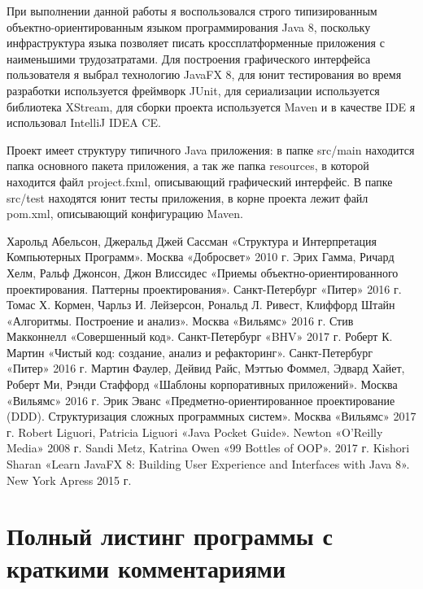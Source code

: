 \documentclass[russian,utf8,simple,hpadding=10mm,vpadding=20mm]{eskdtext}
\begin{document}
При выполнении данной работы я воспользовался строго типизированным объектно-ориентированным языком программирования Java 8, поскольку инфраструктура языка позволяет писать кроссплатформенные приложения с наименьшими трудозатратами. Для построения графического интерфейса пользователя я выбрал технологию JavaFX 8, для юнит тестирования во время разработки используется фреймворк JUnit, для сериализации используется библиотека XStream, для сборки проекта используется Maven и в качестве IDE я использовал IntelliJ IDEA CE.

Проект имеет структуру типичного Java приложения: в папке src/main находится папка основного пакета приложения, а так же папка resources, в которой находится файл project.fxml, описывающий графический интерфейс. В папке src/test находятся юнит тесты приложения, в корне проекта лежит файл pom.xml, описывающий конфигурацию Maven.

\newpage
\begin{thebibliography}{99}
	Харольд Абельсон, Джеральд Джей Сассман «Структура и Интерпретация Компьютерных Программ». Москва «Добросвет» 2010 г.
	Эрих Гамма, Ричард Хелм, Ральф Джонсон, Джон Влиссидес «Приемы объектно-ориентированного проектирования. Паттерны проектирования». Санкт-Петербург «Питер» 2016 г.
	Томас Х. Кормен, Чарльз И. Лейзерсон, Рональд Л. Ривест, Клиффорд Штайн «Алгоритмы. Построение и анализ». Москва «Вильямс» 2016 г.
	Стив Макконнелл «Совершенный код». Санкт-Петербург «BHV» 2017 г.
	Роберт К. Мартин «Чистый код: создание, анализ и рефакторинг». Санкт-Петербург «Питер» 2016 г.
	Мартин Фаулер, Дейвид Райс, Мэттью Фоммел, Эдвард Хайет, Роберт Ми, Рэнди Стаффорд «Шаблоны корпоративных приложений». Москва «Вильямс» 2016 г.
	Эрик Эванс «Предметно-ориентированное проектирование (DDD). Структуризация сложных программных систем». Москва «Вильямс» 2017 г.
	Robert Liguori, Patricia Liguori «Java Pocket Guide». Newton «O'Reilly Media» 2008 г.
	Sandi Metz, Katrina Owen «99 Bottles of OOP». 2017 г.
 Kishori Sharan «Learn JavaFX 8: Building User Experience and Interfaces with Java 8». New York Apress 2015 г.
\end{thebibliography}

\newpage
\parindent=15mm
\linespread{1,5}
\section*{Полный листинг программы с краткими комментариями}
%
\end{document}
